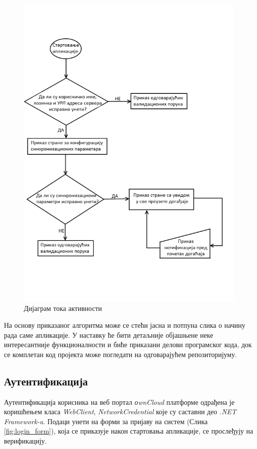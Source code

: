 \begin{figure}[H]
	\centering
	\includegraphics[scale=1]{slike/tok_aktivnosti_nov.png}
	\caption{Дијаграм тока активности}
	\label{fig:application_alogorithm}
\end{figure}

На основу приказаног алгоритма  може се стећи јасна и потпуна слика о начину рада саме апликације. У наставку ће бити детаљније објашњене неке интересантније функционалности и биће приказани делови програмског кода, док се комплетан код пројекта може погледати на одговарајућем репозиторијуму\cite{svn_repo}.

\subsection{Аутентификација}

Аутентификација корисника на веб портал \textit{оwnCloud} платформе одрађена је коришћењем класа \textit{WebClient}, \textit{NetworkCredential} које су саставни део \textit{.NET Framework-a}.  Подаци унети на форми за пријаву на систем (Слика \ref{fig:login_form}), која се приказује након стартовања апликације, се прослеђују на верификацију.

